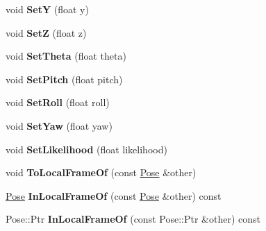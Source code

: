\begin{DoxyCompactItemize}
void {\bfseries SetY} (float y)
\item 
\mbox{\label{classdepth__clustering_1_1Pose_a115b7eaf6d77c55b7ab495f39c15fefd}} 
void {\bfseries SetZ} (float z)
\item 
\mbox{\label{classdepth__clustering_1_1Pose_a7a548bdee4f48f7bb0816897ef592d0f}} 
void {\bfseries Set\+Theta} (float theta)
\item 
\mbox{\label{classdepth__clustering_1_1Pose_a14002c6e14489f3df57068b77370d150}} 
void {\bfseries Set\+Pitch} (float pitch)
\item 
\mbox{\label{classdepth__clustering_1_1Pose_aadb23ff1c4bd7c946ce36c794dfabbeb}} 
void {\bfseries Set\+Roll} (float roll)
\item 
\mbox{\label{classdepth__clustering_1_1Pose_ae7c64f3c2486b6cdb981fb282da946fc}} 
void {\bfseries Set\+Yaw} (float yaw)
\item 
\mbox{\label{classdepth__clustering_1_1Pose_a52cfa58dd1e0810656dd18dcc324f465}} 
void {\bfseries Set\+Likelihood} (float likelihood)
\item 
\mbox{\label{classdepth__clustering_1_1Pose_a639df39dd81c107f864fc34ab85c6f37}} 
void {\bfseries To\+Local\+Frame\+Of} (const \hyperlink{classdepth__clustering_1_1Pose}{Pose} \&other)
\item 
\mbox{\label{classdepth__clustering_1_1Pose_adab81ff679ed92e0e2f3b0edaa22904d}} 
\hyperlink{classdepth__clustering_1_1Pose}{Pose} {\bfseries In\+Local\+Frame\+Of} (const \hyperlink{classdepth__clustering_1_1Pose}{Pose} \&other) const
\item 
\mbox{\label{classdepth__clustering_1_1Pose_a50b753dc0f4037802bf6eb7288faa1ca}} 
Pose\+::\+Ptr {\bfseries In\+Local\+Frame\+Of} (const Pose\+::\+Ptr \&other) const
\item 
\mbox{\label{classdepth__clustering_1_1Pose_a79aad7062818ef15d006b2fd9b3b1d32}} 

\end{DoxyCompactItemize}
